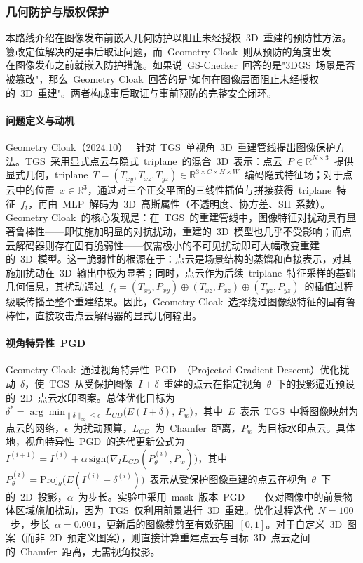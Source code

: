 \subsubsection{几何防护与版权保护}

本路线介绍在图像发布前嵌入几何防护以阻止未经授权~3D~重建的预防性方法。篡改定位解决的是事后取证问题，而~Geometry Cloak~则从预防的角度出发——在图像发布之前就嵌入防护措施。如果说~GS-Checker~回答的是"3DGS~场景是否被篡改"，那么~Geometry Cloak~回答的是"如何在图像层面阻止未经授权的~3D~重建"。两者构成事后取证与事前预防的完整安全闭环。

\paragraph{问题定义与动机} Geometry Cloak（2024.10）~\cite{2410_22705} 针对~TGS~单视角~3D~重建管线提出图像保护方法。TGS~采用显式点云与隐式~triplane~的混合~3D~表示：点云~$P \in \mathbb{R}^{N \times 3}$~提供显式几何，triplane~$T = (T_{xy}, T_{xz}, T_{yz}) \in \mathbb{R}^{3 \times C \times H \times W}$~编码隐式特征场；对于点云中的位置~$x \in \mathbb{R}^3$，通过对三个正交平面的三线性插值与拼接获得~triplane~特征~$f_t$，再由~MLP~解码为~3D~高斯属性（不透明度、协方差、SH~系数）。Geometry Cloak~的核心发现是：在~TGS~的重建管线中，图像特征对扰动具有显著鲁棒性——即使施加明显的对抗扰动，重建的~3D~模型也几乎不受影响；而点云解码器则存在固有脆弱性——仅需极小的不可见扰动即可大幅改变重建的~3D~模型。这一脆弱性的根源在于：点云是场景结构的蒸馏和直接表示，对其施加扰动在~3D~输出中极为显著；同时，点云作为后续~triplane~特征采样的基础几何信息，其扰动通过~$f_t = (T_{xy}, P_{xy}) \oplus (T_{xz}, P_{xz}) \oplus (T_{yz}, P_{yz})$~的插值过程级联传播至整个重建结果。因此，Geometry Cloak~选择绕过图像级特征的固有鲁棒性，直接攻击点云解码器的显式几何输出。

\paragraph{视角特异性~PGD} Geometry Cloak~通过视角特异性~PGD~（Projected Gradient Descent）优化扰动~$\delta$，使~TGS~从受保护图像~$I + \delta$~重建的点云在指定视角~$\theta$~下的投影逼近预设的~2D~点云水印图案。总体优化目标为~$\delta^* = \arg\min_{\|\delta\|_\infty \leq \epsilon}\, L_{CD}\!\bigl(E(I+\delta),\, P_w\bigr)$，其中~$E$~表示~TGS~中将图像映射为点云的网络，$\epsilon$~为扰动预算，$L_{CD}$~为~Chamfer~距离，$P_w$~为目标水印点云。具体地，视角特异性~PGD~的迭代更新公式为~$I^{(i+1)} = I^{(i)} + \alpha\,\mathrm{sign}\!\bigl(\nabla_I L_{CD}(P_\theta^{(i)}, P_w)\bigr)$，其中~$P_\theta^{(i)} = \mathrm{Proj}_\theta\!\bigl(E(I^{(i)} + \delta^{(i)})\bigr)$~表示从受保护图像重建的点云在视角~$\theta$~下的~2D~投影，$\alpha$~为步长。实验中采用~mask~版本~PGD——仅对图像中的前景物体区域施加扰动，因为~TGS~仅利用前景进行~3D~重建。优化过程迭代~$N=100$~步，步长~$\alpha = 0.001$，更新后的图像裁剪至有效范围~$[0,1]$。对于自定义~3D~图案（而非~2D~预定义图案），则直接计算重建点云与目标~3D~点云之间的~Chamfer~距离，无需视角投影。

